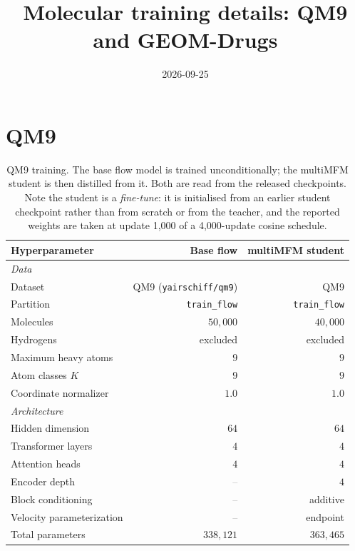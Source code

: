 \documentclass[11pt]{article}
\title{Molecular training details: QM9 and GEOM-Drugs}
\date{2026-09-25}
\newcommand{\naa}{\textcolor{gray}{--}}
\begin{document}
\maketitle

\section{QM9}

\begin{table}[h]\centering
\caption{QM9 training. The base flow model is trained unconditionally; the
multiMFM student is then distilled from it. Both are read from the released
checkpoints. Note the student is a \emph{fine-tune}: it is initialised from an
earlier student checkpoint rather than from scratch or from the teacher, and the
reported weights are taken at update 1{,}000 of a 4{,}000-update cosine schedule.}
\label{tab:qm9-training}
\begin{tabular}{lrr}
\toprule
\textbf{Hyperparameter} & \textbf{Base flow} & \textbf{multiMFM student} \\
\midrule
\multicolumn{3}{l}{\emph{Data}} \\
Dataset                        & QM9 (\texttt{yairschiff/qm9}) & QM9 \\
Partition                      & \texttt{train\_flow} & \texttt{train\_flow} \\
Molecules                      & $50{,}000$ & $40{,}000$ \\
Hydrogens                      & excluded & excluded \\
Maximum heavy atoms            & $9$ & $9$ \\
Atom classes $K$               & $9$ & $9$ \\
Coordinate normalizer          & $1.0$ & $1.0$ \\
\midrule
\multicolumn{3}{l}{\emph{Architecture}} \\
Hidden dimension               & $64$ & $64$ \\
Transformer layers             & $4$  & $4$ \\
Attention heads                & $4$  & $4$ \\
Encoder depth                  & \naa & $4$ \\
Block conditioning             & \naa & additive \\
Velocity parameterization      & \naa & endpoint \\
Total parameters               & $338{,}121$ & $363{,}465$ \\

\end{tabular}
\end{table}
\end{document}
